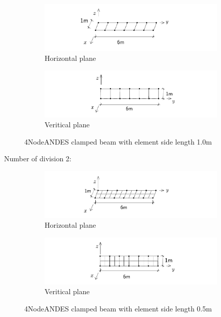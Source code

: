 \documentclass[fleqn,11pt]{article}
\begin{document}
\begin{figure}[H]
  \centering
    \begin{subfigure}{0.5\textwidth}
      \centering
      \includegraphics[width=9cm]{../Figure-files/beam_ANDES_xy_bending.pdf}
      \caption{Horizontal plane}
    \end{subfigure}
    \begin{subfigure}{0.5\textwidth}
      \centering
      \includegraphics[width=9cm]{../Figure-files/beam_ANDES_yz_inPlane.pdf}
      \caption{Veritical  plane}
    \end{subfigure}
  \caption{4NodeANDES clamped beam with element side length 1.0m }
  \label{fig 4NodeANDES clamped beams with element side length 1.0m}
\end{figure}


Number of division 2:

\begin{figure}[H]
  \centering
    \begin{subfigure}{0.5\textwidth}
      \centering
      \includegraphics[width=9cm]{../Figure-files/beam_ANDES_xy_more_2.pdf}
      \caption{Horizontal plane}
    \end{subfigure}
    \begin{subfigure}{0.5\textwidth}
      \centering
      \includegraphics[width=9cm]{../Figure-files/beam_ANDES_yz_more_2.pdf}
      \caption{Veritical  plane}
    \end{subfigure}
  \caption{4NodeANDES clamped beam with element side length 0.5m }
  \label{fig 4NodeANDES clamped beams with element side length 0.5m}
\end{figure}
\end{document}
